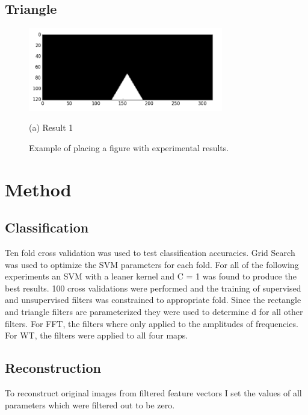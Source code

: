 \documentclass{article}
\begin{document}
\subsection{Triangle}

\begin{figure}[!htbp]

\begin{minipage}[b]{1.0\linewidth}
  \centering
  \centerline{\includegraphics[width=8.5cm]{tri}}
  \centerline{(a) Result 1}\medskip
\end{minipage}
%
\caption{Example of placing a figure with experimental results.}
\label{fig:res}
%
\end{figure}

\section{Method}
\label{sec:Method}

\subsection{Classification}

Ten fold cross validation was used to test classification accuracies. Grid Search was used to optimize the SVM parameters for each fold. For all of the following experiments an SVM with a leaner kernel and C = 1 was found to produce the best results. 100 cross validations were performed and the training of supervised and unsupervised filters was constrained to appropriate fold. Since the rectangle and triangle filters are parameterized they were used to determine d for all other filters. For FFT, the filters where only applied to the amplitudes of frequencies. For WT, the filters were applied to all four maps.     

\subsection{Reconstruction}

To reconstruct original images from filtered feature vectors I set the values of all parameters which were filtered out to be zero.  
\end{document}
